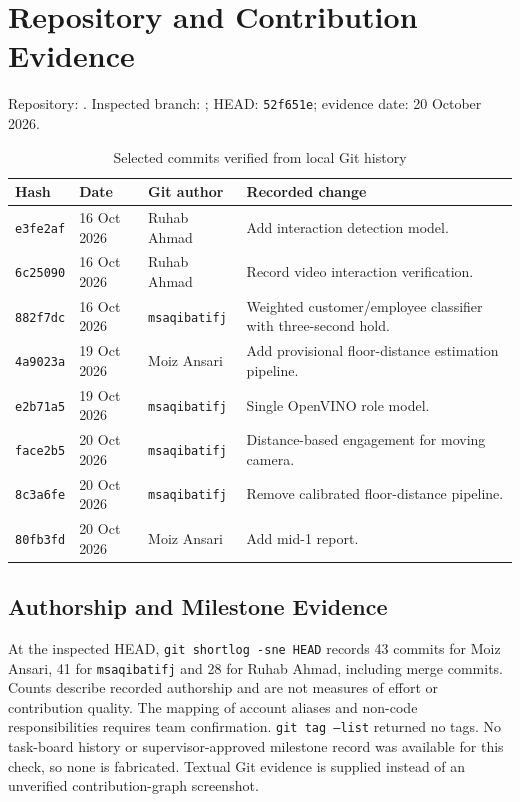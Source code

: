 \chapter{Repository and Contribution Evidence}
\label{app:repo}
Repository: . Inspected branch: ; HEAD: \texttt{52f651e}; evidence date: 20 October 2026.

\begin{longtable}{P{0.13\textwidth}P{0.16\textwidth}P{0.18\textwidth}P{0.41\textwidth}}
\caption{Selected commits verified from local Git history}\\
\toprule
Hash & Date & Git author & Recorded change\\
\midrule
\endhead
\texttt{e3fe2af} & 16 Oct 2026 & Ruhab Ahmad & Add interaction detection model.\\
\texttt{6c25090} & 16 Oct 2026 & Ruhab Ahmad & Record video interaction verification.\\
\texttt{882f7dc} & 16 Oct 2026 & \texttt{msaqibatifj} & Weighted customer/employee classifier with three-second hold.\\
\texttt{4a9023a} & 19 Oct 2026 & Moiz Ansari & Add provisional floor-distance estimation pipeline.\\
\texttt{e2b71a5} & 19 Oct 2026 & \texttt{msaqibatifj} & Single OpenVINO role model.\\
\texttt{face2b5} & 20 Oct 2026 & \texttt{msaqibatifj} & Distance-based engagement for moving camera.\\
\texttt{8c3a6fe} & 20 Oct 2026 & \texttt{msaqibatifj} & Remove calibrated floor-distance pipeline.\\
\texttt{80fb3fd} & 20 Oct 2026 & Moiz Ansari & Add mid-1 report.\\
\bottomrule
\end{longtable}

\section{Authorship and Milestone Evidence}
At the inspected HEAD, \texttt{git shortlog -sne HEAD} records 43 commits for Moiz Ansari, 41 for \texttt{msaqibatifj} and 28 for Ruhab Ahmad, including merge commits. Counts describe recorded authorship and are not measures of effort or contribution quality. The mapping of account aliases and non-code responsibilities requires team confirmation. \texttt{git tag --list} returned no tags. No task-board history or supervisor-approved milestone record was available for this check, so none is fabricated. Textual Git evidence is supplied instead of an unverified contribution-graph screenshot.

